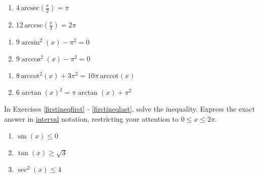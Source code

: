 \begin{multicols}{2}
\begin{enumerate}
\setcounter{enumi}{\value{HW}}

\item $4 \,\text{arcsec}\left(\frac{x}{2}\right) = \pi$   %
\item $12 \,\text{arccsc}\left(\frac{x}{3}\right) = 2\pi$   %

\setcounter{HW}{\value{enumi}}
\end{enumerate}
\end{multicols}

\begin{multicols}{2}
\begin{enumerate}
\setcounter{enumi}{\value{HW}}

\item $9 \arcsin^{2}(x) - \pi^2 = 0$   %
\item $9 \arccos^{2}(x) - \pi^2 = 0$   %

\setcounter{HW}{\value{enumi}}
\end{enumerate}
\end{multicols}

\begin{multicols}{2}
\begin{enumerate}
\setcounter{enumi}{\value{HW}}

\item $8 \, \text{arccot}^{2}(x)+3\pi^2=10 \pi \, \text{arccot}(x)$   %
\item $6 \arctan(x)^2= \pi \arctan(x)+\pi^2$  \label{lastinveqn}  %

\setcounter{HW}{\value{enumi}}
\end{enumerate}
\end{multicols}


In Exercises \ref{firstineqfirst} - \ref{firstineqlast}, solve the inequality.  Express the exact answer in \underline{interval} notation, restricting your attention to $0 \leq x \leq 2\pi$.

\begin{multicols}{3}

\begin{enumerate}

\setcounter{enumi}{\value{HW}}

\item $\sin \left( x \right) \leq 0$ \label{firstineqfirst}
\item $\tan \left( x \right) \geq \sqrt{3}$
\item $\sec^{2} \left( x \right) \leq 4$

\setcounter{HW}{\value{enumi}}

\end{enumerate}

\end{multicols}

